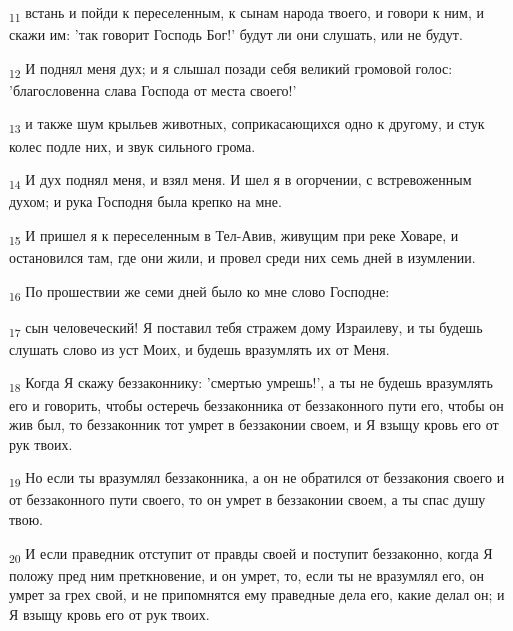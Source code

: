\begin{tcolorbox}
\textsubscript{11} встань и пойди к переселенным, к сынам народа твоего, и говори к ним, и скажи им: 'так говорит Господь Бог!' будут ли они слушать, или не будут.
\end{tcolorbox}
\begin{tcolorbox}
\textsubscript{12} И поднял меня дух; и я слышал позади себя великий громовой голос: 'благословенна слава Господа от места своего!'
\end{tcolorbox}
\begin{tcolorbox}
\textsubscript{13} и также шум крыльев животных, соприкасающихся одно к другому, и стук колес подле них, и звук сильного грома.
\end{tcolorbox}
\begin{tcolorbox}
\textsubscript{14} И дух поднял меня, и взял меня. И шел я в огорчении, с встревоженным духом; и рука Господня была крепко на мне.
\end{tcolorbox}
\begin{tcolorbox}
\textsubscript{15} И пришел я к переселенным в Тел-Авив, живущим при реке Ховаре, и остановился там, где они жили, и провел среди них семь дней в изумлении.
\end{tcolorbox}
\begin{tcolorbox}
\textsubscript{16} По прошествии же семи дней было ко мне слово Господне:
\end{tcolorbox}
\begin{tcolorbox}
\textsubscript{17} сын человеческий! Я поставил тебя стражем дому Израилеву, и ты будешь слушать слово из уст Моих, и будешь вразумлять их от Меня.
\end{tcolorbox}
\begin{tcolorbox}
\textsubscript{18} Когда Я скажу беззаконнику: 'смертью умрешь!', а ты не будешь вразумлять его и говорить, чтобы остеречь беззаконника от беззаконного пути его, чтобы он жив был, то беззаконник тот умрет в беззаконии своем, и Я взыщу кровь его от рук твоих.
\end{tcolorbox}
\begin{tcolorbox}
\textsubscript{19} Но если ты вразумлял беззаконника, а он не обратился от беззакония своего и от беззаконного пути своего, то он умрет в беззаконии своем, а ты спас душу твою.
\end{tcolorbox}
\begin{tcolorbox}
\textsubscript{20} И если праведник отступит от правды своей и поступит беззаконно, когда Я положу пред ним преткновение, и он умрет, то, если ты не вразумлял его, он умрет за грех свой, и не припомнятся ему праведные дела его, какие делал он; и Я взыщу кровь его от рук твоих.
\end{tcolorbox}
